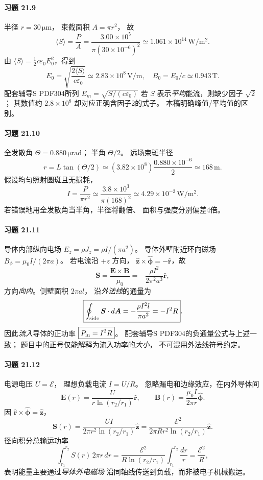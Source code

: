 \paragraph{习题 21.9}
半径 \(r=30\,\mathrm{\mu m}\)，
束截面积 \(A=\pi r^2\)，
故
\[
\boxed{\langle S\rangle=\frac PA
=\frac{3.00\times10^5}
{\pi(30\times10^{-6})^2}
\simeq1.061\times10^{14}\,\mathrm{W/m^2}}.
\]
由
\(\langle S\rangle
=\frac12c\varepsilon_0E_0^2\)，得到
\[
\boxed{E_0=\sqrt{\frac{2\langle S\rangle}{c\varepsilon_0}}
\simeq2.83\times10^8\,\mathrm{V/m}},\quad
\boxed{B_0=E_0/c\simeq0.943\,\mathrm T}.
\]
配套辅导S PDF304所列
\(E_m=\sqrt{S/(c\varepsilon_0)}\)
若 \(S\) 表示\emph{平均}能流，则缺少因子 \(\sqrt2\)；
其数值约 \(2.8\times10^8\) 却对应正确含因子2的式子。
本稿明确峰值/平均值的区别。

\paragraph{习题 21.10}
全发散角 \(\Theta=0.880\,\mathrm{\mu rad}\)；
半角 \(\Theta/2\)。
远场束斑半径
\[
\boxed{r=L\tan(\Theta/2)
\simeq(3.82\times10^8)\frac{0.880\times10^{-6}}2
\simeq168\,\mathrm m}.
\]
假设均匀照射圆斑且无损耗，
\[
\boxed{I=\frac{P}{\pi r^2}
\simeq\frac{3.8\times10^3}{\pi(168)^2}
\simeq4.29\times10^{-2}\,\mathrm{W/m^2}}.
\]
若错误地用全发散角当半角，半径将翻倍、
面积与强度分别偏差4倍。

\paragraph{习题 21.11}
导体内部纵向电场
\(E_z=\rho J_z=\rho I/(\pi a^2)\)。
导体外壁附近环向磁场
\(B_\phi=\mu_0I/(2\pi a)\)。
若电流沿 \(+z\) 方向，
\(\hat{\boldsymbol z}\times\hat{\boldsymbol\phi}
=-\hat{\boldsymbol r}\)，故
\[
\boldsymbol S=\frac{\boldsymbol E\times\boldsymbol B}{\mu_0}
=-\frac{\rho I^2}{2\pi^2a^3}\hat{\boldsymbol r},
\]
方向\emph{向内}。侧壁面积 \(2\pi al\)，
沿\emph{外法线}的通量为
\[
\boxed{\oint_{\rm side}\boldsymbol S\cdot d\boldsymbol A
=-\frac{\rho I^2l}{\pi a^2}=-I^2R}.
\]
因此\emph{流入}导体的正功率
\(\boxed{P_{\rm in}=I^2R}\)。
配套辅导S PDF304的负通量公式与上述一致；
题目中的正号仅能解释为流入功率的\emph{大小}，
不可混用外法线符号约定。

\paragraph{习题 21.12}
电源电压 \(U=\mathcal E\)，
理想负载电流 \(I=U/R\)。
忽略漏电和边缘效应，在内外导体间
\[
\boldsymbol E(r)=\frac{U}
{r\ln(r_2/r_1)}\hat{\boldsymbol r},\qquad
\boldsymbol B(r)=\frac{\mu_0I}{2\pi r}
\hat{\boldsymbol\phi}.
\]
因 \(\hat{\boldsymbol r}\times\hat{\boldsymbol\phi}
=\hat{\boldsymbol z}\)，
\[
\boxed{\boldsymbol S(r)=
\frac{UI}{2\pi r^2\ln(r_2/r_1)}\hat{\boldsymbol z}
=\frac{\mathcal E^2}
{2\pi Rr^2\ln(r_2/r_1)}\hat{\boldsymbol z}}.
\]
径向积分总输运功率
\[
\int_{r_1}^{r_2}S(r)\,2\pi r\,dr
=\frac{\mathcal E^2}{R\ln(r_2/r_1)}
\int_{r_1}^{r_2}\frac{dr}{r}
=\boxed{\frac{\mathcal E^2}{R}},
\]
表明能量主要通过\emph{导体外电磁场}
沿同轴线传送到负载，而非被电子机械搬运。

